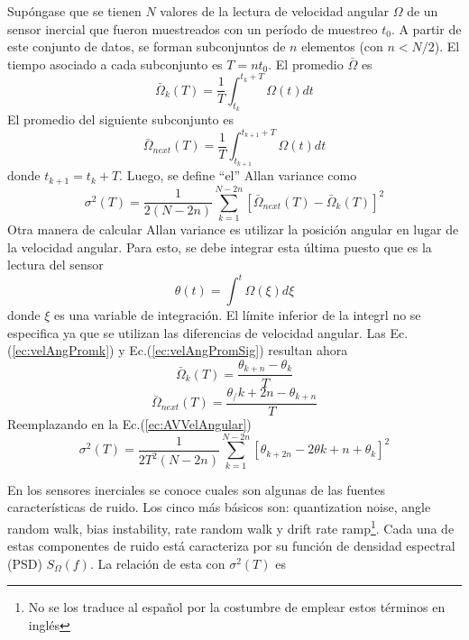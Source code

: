 \documentclass[a4paper,11pt,twoside]{IT-CNEA}
\begin{document}
Supóngase que se tienen $N$ valores de la lectura de velocidad angular $\Omega$ de un sensor inercial que fueron muestreados con un período de muestreo $t_0$. A partir de este conjunto de datos, se forman subconjuntos de $n$ elementos (con $n<N/2$). El tiempo asociado a cada subconjunto es $T=nt_0$. El promedio $\bar{\Omega}$ es
\begin{equation}
\bar{\Omega}_k(T)=\frac{1}{T}\int_{t_k}^{t_k+T}\Omega(t)dt
\label{ec:velAngPromk}
\end{equation}
El promedio del siguiente subconjunto es
\begin{equation}
\bar{\Omega}_{next}(T)=\frac{1}{T}\int_{t_{k+1}}^{t_{k+1}+T}\Omega(t)dt
\label{ec:velAngPromSig}
\end{equation}
donde $t_{k+1}=t_k+T$. Luego, se define ``el'' Allan variance como
\begin{equation}
\sigma^2(T)=\frac{1}{2\left( N-2n\right)}\sum_{k=1}^{N-2n}\left[\bar{\Omega}_{next}(T)- \bar{\Omega}_k(T)\right]^2
\label{ec:AVVelAngular}
\end{equation}
Otra manera de calcular Allan variance es utilizar la posición angular en lugar de la velocidad angular. Para esto, se debe integrar esta última puesto que es la lectura del sensor
\begin{equation}
\theta(t)=\int^t\Omega(\xi)d\xi
\end{equation}
donde $\xi$ es una variable de integración. El límite inferior de la integrl no se especifica ya que se utilizan las diferencias de velocidad angular. Las Ec.(\ref{ec:velAngPromk}) y Ec.(\ref{ec:velAngPromSig}) resultan ahora
\begin{equation}
\bar{\Omega}_{k}(T)=\frac{\theta_{k+n}-\theta_k}{T}
\end{equation}
\begin{equation}
\bar{\Omega}_{next}(T)=\frac{\theta_/{k+2n}-\theta_{k+n}}{T}
\end{equation}
Reemplazando en la Ec.(\ref{ec:AVVelAngular})
\begin{equation}
\sigma^2(T)=\frac{1}{2T^2\left( N-2n\right)}\sum_{k=1}^{N-2n}\left[ \theta_{k+2n}-2\theta{k+n}+\theta_k \right]^2
\label{ec:AVPosAngular}
\end{equation}
\par En los sensores inerciales se conoce cuales son algunas de las fuentes características de ruido. Los cinco más básicos son: quantization noise, angle random walk, bias instability, rate random walk y drift rate ramp\footnote{No se los traduce al español por la costumbre de emplear estos términos en inglés}. Cada una de estas componentes de ruido está caracteriza por su función de densidad espectral (PSD) $S_{\Omega}(f)$. La relación de esta con $\sigma^2(T)$  es
\end{document}
